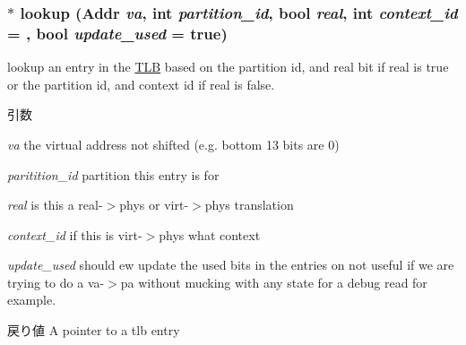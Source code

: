 \hypertarget{classSparcISA_1_1TLB_a74fbbb81cfaa89e81165a62736e4311a}{
\subsubsection[{lookup}]{ $\ast$ lookup ({\bf Addr} {\em va}, \/  int {\em partition\_\-id}, \/  bool {\em real}, \/  int {\em context\_\-id} = {}, \/  bool {\em update\_\-used} = {\ttfamily true})}}
\label{classSparcISA_1_1TLB_a74fbbb81cfaa89e81165a62736e4311a}
lookup an entry in the \hyperlink{classSparcISA_1_1TLB}{TLB} based on the partition id, and real bit if real is true or the partition id, and context id if real is false. 
\begin{DoxyParams}{引数}
\item[{\em va}]the virtual address not shifted (e.g. bottom 13 bits are 0) \item[{\em paritition\_\-id}]partition this entry is for \item[{\em real}]is this a real-\/$>$phys or virt-\/$>$phys translation \item[{\em context\_\-id}]if this is virt-\/$>$phys what context \item[{\em update\_\-used}]should ew update the used bits in the entries on not useful if we are trying to do a va-\/$>$pa without mucking with any state for a debug read for example. \end{DoxyParams}
\begin{DoxyReturn}{戻り値}
A pointer to a tlb entry 
\end{DoxyReturn}



